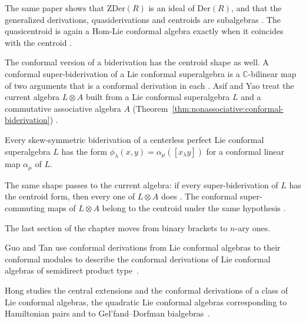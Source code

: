 The same paper shows that $\mathrm{ZDer}(R)$ is an ideal of
$\mathrm{Der}(R)$, and that the generalized derivations, quasiderivations and
centroids are subalgebras \cite[Proposition~5.2, p.~17]{ZhaoYuanChen2018}. The
quasicentroid is again a Hom-Lie conformal algebra exactly when it coincides with
the centroid \cite[Proposition~5.6, p.~19]{ZhaoYuanChen2018}.

The conformal version of a biderivation has the centroid shape as well. A
conformal super-biderivation of a Lie conformal superalgebra is a
$\mathbb{C}$-bilinear map of two arguments that is a conformal derivation in each
\cite[Definition~2.2, p.~2]{AsifYao2023}. Asif and Yao treat the current algebra
$L\otimes A$ built from a Lie conformal superalgebra $L$ and a commutative
associative algebra $A$ (Theorem~\ref{thm:nonassociative:conformal-biderivation}) \cite[p.~1]{AsifYao2023}.

\begin{theorem}\label{thm:nonassociative:conformal-biderivation}
Every skew-symmetric biderivation of a centerless perfect Lie conformal
superalgebra $L$ has the form $\phi_\lambda(x,y)=\alpha_\mu([x_\lambda y])$ for
a conformal linear map $\alpha_\mu$ of $L$.
\end{theorem}

The same shape passes to the current algebra: if every super-biderivation of $L$
has the centroid form, then every one of $L\otimes A$ does
\cite[Theorem~3.3, p.~7]{AsifYao2023}. The conformal super-commuting maps of
$L\otimes A$ belong to the centroid under the same hypothesis
\cite[Theorem~4.4, p.~8]{AsifYao2023}.

The last section of the chapter
moves from binary brackets to $n$-ary ones. %

Guo and Tan use conformal derivations from Lie conformal algebras to their conformal modules to describe the conformal derivations of Lie conformal algebras of semidirect product type~\cite{WlConformalDerivationsOfSemidire2014}.

Hong studies the central extensions and the conformal derivations of a class of Lie conformal algebras, the quadratic Lie conformal algebras corresponding to Hamiltonian pairs and to Gel'fand--Dorfman bialgebras~\cite{WlCentralExtensionsAndConformalD2019}.
